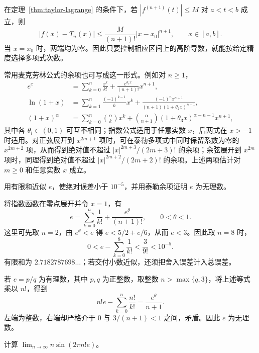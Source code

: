 \begin{corollary}[泰勒逼近的误差界]
\label{cor:taylor-lagrange-error-bound}
在定理~\ref{thm:taylor-lagrange} 的条件下，若 $|f^{(n+1)}(t)|\leq M$ 对 $a<t<b$ 成立，则
\begin{equation}
    |f(x)-T_n(x)|\leq\frac{M}{(n+1)!}|x-x_0|^{n+1},
    \qquad x\in[a,b].
    \label{eq:taylor-lagrange-error-bound}
\end{equation}
当 $x=x_0$ 时，两端均为零。因此只要控制相应区间上的高阶导数，就能按给定精度选择多项式次数。
\end{corollary}

常用麦克劳林公式的余项也可写成这一形式。例如对 $n\geq1$，
\begin{align*}
    e^x&=\sum_{k=0}^n\frac{x^k}{k!}
        +\frac{e^{\theta_1x}}{(n+1)!}x^{n+1},\\
    \ln(1+x)&=\sum_{k=1}^n\frac{(-1)^{k-1}}k x^k
        +\frac{(-1)^nx^{n+1}}{(n+1)(1+\theta_2x)^{n+1}},\\
    (1+x)^\alpha&=\sum_{k=0}^n\binom\alpha k x^k
        +\binom\alpha{n+1}(1+\theta_3x)^{\alpha-n-1}x^{n+1},
\end{align*}
其中各 $\theta_i\in(0,1)$ 可互不相同；指数公式适用于任意实数 $x$，后两式在 $x>-1$ 时适用。对正弦展开到 $x^{2m+1}$ 项时，可在泰勒多项式中同时保留系数为零的 $x^{2m+2}$ 项，从而得到绝对值不超过 $|x|^{2m+3}/(2m+3)!$ 的余项；余弦展开到 $x^{2m}$ 项时，同理得到绝对值不超过 $|x|^{2m+2}/(2m+2)!$ 的余项。上述两项估计对 $m\geq0$ 和任意实数 $x$ 成立。

\begin{example}
\label{ex:taylor-approximation-and-irrationality-of-e}
用有限和近似 $e$，使绝对误差小于 $10^{-5}$，并用泰勒余项证明 $e$ 为无理数。
\end{example}

\begin{solve}
将指数函数在零点展开并令 $x=1$，有
\[
    e=\sum_{k=0}^n\frac1{k!}+\frac{e^\theta}{(n+1)!},
    \qquad 0<\theta<1.
\]
这里可先取 $n=2$，由 $e^\theta<e$ 得 $e<5/2+e/6$，从而 $e<3$。因此取 $n=8$ 时，
\[
    0<e-\sum_{k=0}^8\frac1{k!}<\frac3{9!}<10^{-5}.
\]
有限和为 $2.7182787698\ldots$；若交付小数近似，还须把舍入误差计入总误差。

若 $e=p/q$ 为有理数，其中 $p,q$ 为正整数，取整数 $n>\max\{q,3\}$，将上述等式乘以 $n!$，得到
\[
    n!e-\sum_{k=0}^n\frac{n!}{k!}=\frac{e^\theta}{n+1}.
\]
左端为整数，右端却严格介于 $0$ 与 $3/(n+1)<1$ 之间，矛盾。因此 $e$ 为无理数。
\end{solve}

\begin{example}
\label{ex:taylor-factorial-exponential-limit}
计算 $\lim_{n\to\infty}n\sin(2\pi n!e)$。
\end{example}

